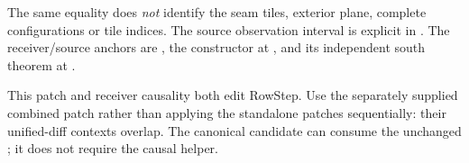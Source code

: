 The same equality does \emph{not} identify the seam tiles, exterior plane, complete configurations or tile indices. The source observation interval is explicit in . The receiver/source anchors are , the constructor at , and its independent south theorem at .

This patch and receiver causality both edit RowStep. Use the separately supplied combined patch rather than applying the standalone patches sequentially: their unified-diff contexts overlap. The canonical candidate can consume the unchanged ; it does not require the causal helper.
